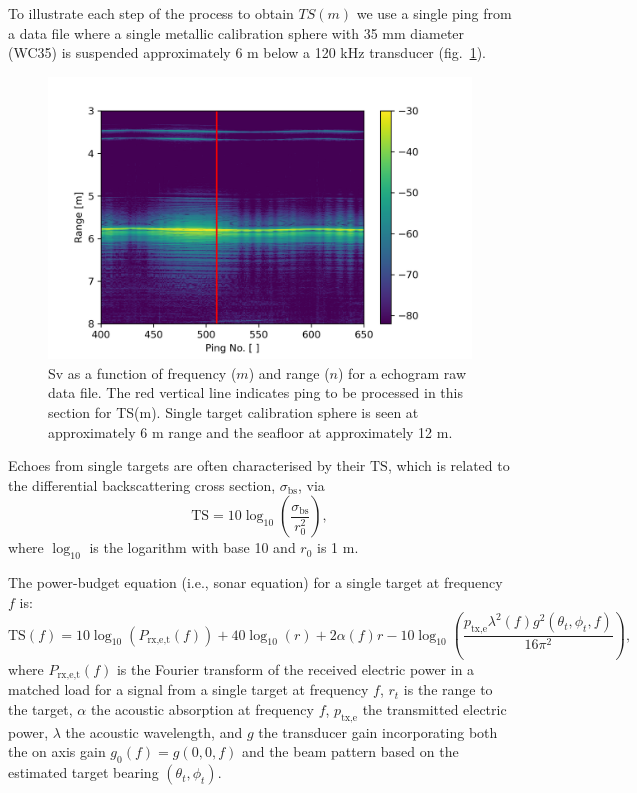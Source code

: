 \documentclass[preprint,12pt,TurnOnLineNumbers]{JASAnew}
\newcommand{\freqsym}{f}
\newcommand{\ptxe}{p_{\textrm{tx,e}}}
\newcommand{\prxetf}{P_{\textrm{rx,e,t}}}
\newcommand{\bs}{\sigma_{\textrm{bs}}}
\newcommand{\ts}{\textrm{TS}}
\newcommand{\range}{r}
\newcommand{\rangeref}{r_0}
\newcommand{\athw}{\phi}
\newcommand{\along}{\theta}
\newcommand{\gain}{g}
\newcommand{\wlen}{\lambda}
\newcommand{\absorp}{\alpha}
\begin{document}
To illustrate each step of the process to obtain $TS(m)$ we use a single ping from a data file where a single metallic calibration sphere with 35 mm diameter (WC35) is suspended approximately 6 m below a 120 kHz transducer (fig.~\ref{Fig_TS_echogram}). 

\begin{figure}
\includegraphics[width=16cm]{Fig_TS_echogram}
\caption{\label{Fig_TS_echogram} Sv as a function of frequency ($m$) and range ($n$) for a echogram raw data file. The red vertical line indicates ping to be processed in this section for TS(m). Single target calibration sphere is seen at approximately 6 m range and the seafloor at approximately 12 m.}
\end{figure}

Echoes from single targets are often characterised by their $\ts$, which is related to the differential backscattering cross section, $\bs$, via
%
\begin{equation}
\label{eq:TS_bs}
\ts = 10\log_{10}\left(\frac{\bs}{\rangeref^2}\right),
\end{equation}
%
where $\log_{10}$ is the logarithm with base 10 and $\rangeref$ is 1 m.

The power-budget equation (i.e., sonar equation) for a single target \citep[Formulation D, ][]{lunde2016} at frequency $\freqsym$ is:
%
\begin{equation}
\label{eq:TS}
\ts(\freqsym) = 10\log_{10}(\prxetf(\freqsym)) + 40\log_{10}(\range) + 2\absorp(\freqsym) \range 
- 10\log_{10}\left( \frac{\ptxe \wlen^2(\freqsym) \gain^2(\along_t,\athw_t,\freqsym)}{16\pi^2} \right),
\end{equation}
%
where $\prxetf(\freqsym)$ is the Fourier transform of the received electric power in a matched load for a signal from a single target at frequency $\freqsym$, $\range_t$ is the range to the target, $\absorp$ the acoustic absorption at frequency $f$, $\ptxe$ the transmitted electric power, $\wlen$ the acoustic wavelength, and $\gain$ the transducer gain incorporating both the on axis gain $\gain_0(\freqsym)=\gain(0,0,\freqsym)$ and the beam pattern based on the estimated target bearing $(\along_t,\athw_t)$.
\end{document}
